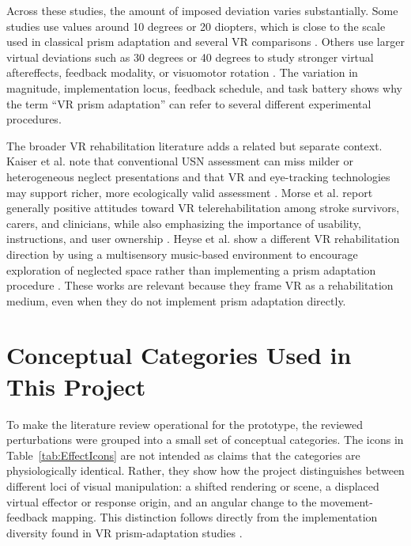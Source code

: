 Across these studies, the amount of imposed deviation varies substantially. Some studies use values around 10 degrees or 20 diopters, which is close to the scale used in classical prism adaptation and several VR comparisons \cite{frassinetti2002long,Ramos2019,anan2025comparative}. Others use larger virtual deviations such as 30 degrees or 40 degrees to study stronger virtual aftereffects, feedback modality, or visuomotor rotation \cite{Gammeri2020,Bourgeois2021,gerken2025sense}. The variation in magnitude, implementation locus, feedback schedule, and task battery shows why the term ``VR prism adaptation'' can refer to several different experimental procedures.

The broader VR rehabilitation literature adds a related but separate context. Kaiser et al. note that conventional USN assessment can miss milder or heterogeneous neglect presentations and that VR and eye-tracking technologies may support richer, more ecologically valid assessment \cite{Hendrik_Knoche_Lit_Review}. Morse et al. report generally positive attitudes toward VR telerehabilitation among stroke survivors, carers, and clinicians, while also emphasizing the importance of usability, instructions, and user ownership \cite{Morse2022}. Heyse et al. show a different VR rehabilitation direction by using a multisensory music-based environment to encourage exploration of neglected space rather than implementing a prism adaptation procedure \cite{heyse2022patient}. These works are relevant because they frame VR as a rehabilitation medium, even when they do not implement prism adaptation directly.

\section{Conceptual Categories Used in This Project}
\label{sec:background-conceptual-categories}

To make the literature review operational for the prototype, the reviewed perturbations were grouped into a small set of conceptual categories. The icons in Table~\ref{tab:EffectIcons} are not intended as claims that the categories are physiologically identical. Rather, they show how the project distinguishes between different loci of visual manipulation: a shifted rendering or scene, a displaced virtual effector or response origin, and an angular change to the movement-feedback mapping. This distinction follows directly from the implementation diversity found in VR prism-adaptation studies \cite{kim2017development,cho2022feasibility,Ramos2019,anan2025comparative,gerken2025sense}.

